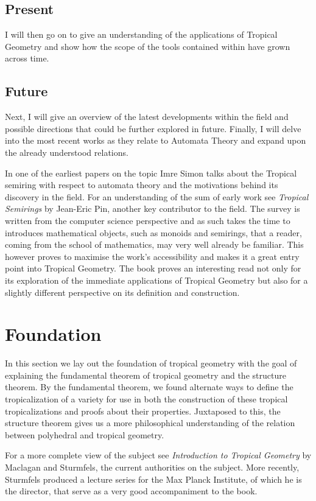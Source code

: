 \documentclass[12pt,a4paper]{amsart}
\theoremstyle{definition}
\theoremstyle{remark}
\begin{document}
\subsection*{Present}
I will then go on to give an understanding of the applications of Tropical Geometry and show how the scope of the tools contained within have grown across time.
\subsection*{Future}
Next, I will give an overview of the latest developments within the field and possible directions that could be further explored in future. 
Finally, I will delve into the most recent works as they relate to Automata Theory and expand upon the already understood relations.

In one of the earliest papers on the topic\cite{10.1007/BFb0017135} Imre Simon talks about the Tropical semiring with respect to automata theory and the motivations behind its discovery in the field.
For an understanding of the sum of early work see \textit{Tropical Semirings}\cite{pin1998tropical} by Jean-Eric Pin, another key contributor to the field.
The survey is written from the computer science perspective and as such takes the time to introduces mathematical objects, such as monoids and semirings, that a reader, coming from the school of mathematics, may very well already be familiar.
This however proves to maximise the work's accessibility and makes it a great entry point into Tropical Geometry.
The book proves an interesting read not only for its exploration of the immediate applications of Tropical Geometry but also for a slightly different perspective on its definition and construction.

\newpage
\section{Foundation}
In this section we lay out the foundation of tropical geometry with the goal of explaining the fundamental theorem of tropical geometry and the structure theorem.
By the fundamental theorem, we found alternate ways to define the tropicalization of a variety for use in both the construction of these tropical tropicalizations and proofs about their properties.
Juxtaposed to this, the structure theorem gives us a more philosophical understanding of the relation between polyhedral and tropical geometry.

For a more complete view of the subject see \textit{Introduction to Tropical Geometry}\cite{MaclaganDiane1974-author2015Ittg} by Maclagan and Sturmfels, the current authorities on the subject. More recently, Sturmfels produced a lecture series\cite{12Trop} for the Max Planck Institute, of which he is the director, that serve as a very good accompaniment to the book.
\end{document}
